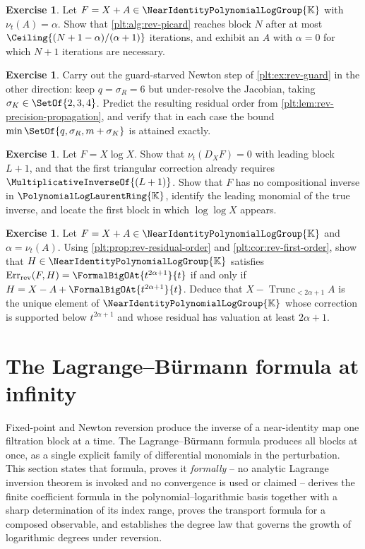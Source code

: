\documentclass[11pt,oneside]{article}
\theoremstyle{plain}
\theoremstyle{definition}
\newtheorem{exercise}[theorem]{Exercise}
\theoremstyle{remark}
\newcommand{\K}{\mathbb{K}}
\newcommand{\PLlau}{\PolynomialLogLaurentRing{\K}}       %
\newcommand{\Gnear}{\NearIdentityPolynomialLogGroup{\K}} %
\newcommand{\ordt}{\nu_{t}}                              %
\newcommand{\Trunc}[2]{\operatorname{Trunc}_{<#2}#1}     %
\newcommand{\DX}{D_{X}}                                  %
\newcommand{\RevErr}[2]{\operatorname{Err}_{\mathrm{rev}}\!\left(#1,#2\right)}
\begin{document}
\begin{exercise}
Let \(F=X+A\in\Gnear\) with \(\ordt(A)=\alpha\).  Show that
\cref{plt:alg:rev-picard} reaches block \(N\) after at most
\(\Ceiling{(N+1-\alpha)/(\alpha+1)}\) iterations, and exhibit an \(A\) with
\(\alpha=0\) for which \(N+1\) iterations are necessary.
\end{exercise}

\begin{exercise}
Carry out the guard-starved Newton step of \cref{plt:ex:rev-guard} in the other
direction: keep \(q=\sigma_R=6\) but under-resolve the Jacobian, taking
\(\sigma_K\in\SetOf{2,3,4}\).  Predict the resulting residual order from
\cref{plt:lem:rev-precision-propagation}, and verify that in each case the
bound \(\min\SetOf{q,\sigma_R,m+\sigma_K}\) is attained exactly.
\end{exercise}

\begin{exercise}
Let \(F=X\log X\).  Show that \(\ordt(\DX F)=0\) with leading block \(L+1\), and
that the first triangular correction already requires
\(\MultiplicativeInverseOf{(L+1)}\).  Show that \(F\) has no compositional
inverse in \(\PLlau\), identify the leading monomial of the true inverse, and
locate the first block in which \(\log\log X\) appears.
\end{exercise}

\begin{exercise}
Let \(F=X+A\in\Gnear\) and \(\alpha=\ordt(A)\).  Using
\cref{plt:prop:rev-residual-order} and \cref{plt:cor:rev-first-order}, show
that \(H\in\Gnear\) satisfies
\(\RevErr{F}{H}=\FormalBigOAt{t^{2\alpha+1}}{t}\) if and only if
\(H=X-A+\FormalBigOAt{t^{2\alpha+1}}{t}\).  Deduce that
\(X-\Trunc{A}{2\alpha+1}\) is the unique element of \(\Gnear\) whose
correction is supported below \(t^{2\alpha+1}\) and whose residual has
valuation at least \(2\alpha+1\).
\end{exercise}

\section{The Lagrange--B\"urmann formula at infinity}
\label{plt:sec:lagrange-burmann}

Fixed-point and Newton reversion produce the inverse of a near-identity map one
filtration block at a time.  The Lagrange--B\"urmann formula produces all blocks
at once, as a single explicit family of differential monomials in the
perturbation.  This section states that formula, proves it \emph{formally} --
no analytic Lagrange inversion theorem is invoked and no convergence is used or
claimed -- derives the finite coefficient formula in the
polynomial--logarithmic basis together with a sharp determination of its index
range, proves the transport formula for a composed observable, and establishes
the degree law that governs the growth of logarithmic degrees under reversion.
\end{document}
